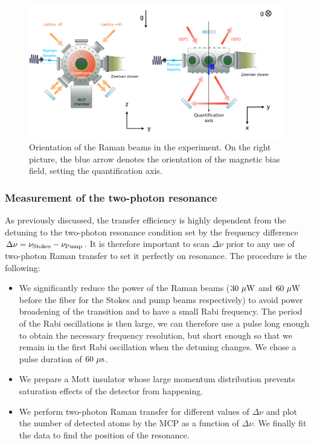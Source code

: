 \begin{figure}
    \centering
    \includegraphics[width=\textwidth]{Fig/Chapter3/raman_sc.png}
    \caption{Orientation of the Raman beams in the experiment. On the right picture, the blue arrow denotes the orientation of the magnetic bias field, setting the quantification axis.}
    \label{fig:raman_sc}
\end{figure}

\subsubsection{Measurement of the two-photon resonance}

As previously discussed, the transfer efficiency is highly dependent from the detuning to the two-photon resonance condition set by the frequency difference $\Delta \nu = \nu_{\rm{Stokes}} - \nu_{\rm{Pump}}$. It is therefore important to scan $\Delta \nu$ prior to any use of two-photon Raman transfer to set it perfectly on resonance. The procedure is the following:

\begin{itemize}
    \item We significantly reduce the power of the Raman beams ($30 \ \mu \rm{W}$ and $60 \ \mu \rm{W}$ before the fiber for the Stokes and pump beams respectively) to avoid power broadening of the transition and to have a small Rabi frequency. The period of the Rabi oscillations is then large, we can therefore use a pulse long enough to obtain the necessary frequency resolution, but short enough so that we remain in the first Rabi oscillation when the detuning changes. We chose a pulse duration of $60 \ \mu \rm{s}$. 
    \item We prepare a Mott insulator whose large momentum distribution prevents saturation effects of the detector from happening.
    \item We perform two-photon Raman transfer for different values of $\Delta \nu$ and plot the number of detected atoms by the MCP as a function of $\Delta \nu$. We finally fit the data to find the position of the resonance. 
\end{itemize}

